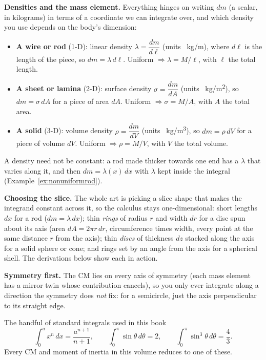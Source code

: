 \textbf{Densities and the mass element.} Everything hinges on writing $dm$ (a scalar, in kilograms) in
terms of a coordinate we can integrate over, and which density you use depends on the body's dimension:
\begin{itemize}
\item \textbf{A wire or rod} (1-D): linear density $\lambda=\dfrac{dm}{d\ell}$ (units \SI{}{kg/m}), where
$d\ell$ is the length of the piece, so $dm=\lambda\,d\ell$. Uniform $\Rightarrow\lambda=M/\ell$, with
$\ell$ the total length.
\item \textbf{A sheet or lamina} (2-D): surface density $\sigma=\dfrac{dm}{dA}$ (units \SI{}{kg/m^2}), so
$dm=\sigma\,dA$ for a piece of area $dA$. Uniform $\Rightarrow\sigma=M/A$, with $A$ the total area.
\item \textbf{A solid} (3-D): volume density $\rho=\dfrac{dm}{dV}$ (units \SI{}{kg/m^3}), so
$dm=\rho\,dV$ for a piece of volume $dV$. Uniform $\Rightarrow\rho=M/V$, with $V$ the total volume.
\end{itemize}
A density need not be constant: a rod made thicker towards one end has a $\lambda$ that varies along it,
and then $dm=\lambda(x)\,dx$ with $\lambda$ kept inside the integral (Example~\ref{ex:nonuniformrod}).

\textbf{Choosing the slice.} The whole art is picking a slice shape that makes the integrand constant
across it, so the calculus stays one-dimensional: short lengths $dx$ for a rod ($dm=\lambda\,dx$); thin
\emph{rings} of radius $r$ and width $dr$ for a disc spun about its axis (area $dA=2\pi r\,dr$,
circumference times width, every point at the same distance $r$ from the axis); thin \emph{discs} of
thickness $dz$ stacked along the axis for a solid sphere or cone; and rings set by an angle from the axis
for a spherical shell. The derivations below show each in action.

\textbf{Symmetry first.} The CM lies on every axis of symmetry (each mass element has a mirror twin whose
contribution cancels), so you only ever integrate along a direction the symmetry does \emph{not} fix: for a
semicircle, just the axis perpendicular to its straight edge.

\begin{tablebox}{The handful of standard integrals used in this book}
\centering
\[
\int_0^{a}x^n\,dx=\frac{a^{n+1}}{n+1},\qquad
\int_0^{\pi}\sin\theta\,d\theta=2,\qquad
\int_0^{\pi}\sin^3\theta\,d\theta=\frac{4}{3}.
\]
Every CM and moment of inertia in this volume reduces to one of these.
\end{tablebox}

